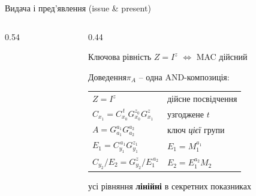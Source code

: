 \documentclass[aspectratio=169, 10pt, xcolor=svgnames]{beamer}
\begin{document}
\begin{frame}{Видача і пред'явлення (issue \& present)}
  \begin{columns}[T]
    \begin{column}{0.54\textwidth}
      \centering
      \resizebox{\linewidth}{!}{}
    \end{column}
    \begin{column}{0.44\textwidth}
      \begin{block}{Ключова рівність}
        \centering $Z = I^{z}$ \quad $\Longleftrightarrow$ \quad MAC дійсний
      \end{block}
      \small Доведення\footnotemark[1] $\pi_A$ -- одна AND-композиція:\par\smallskip
      \footnotesize
      \begin{tabular}{@{}ll@{}}
        $Z = I^{z}$                                   & дійсне посвідчення \\
        $C_{x_1} = C_{x_0}^{\,t}G_{x_0}^{z_0}G_{x_1}^{z}$ & узгоджене $t$ \\
        $A = G_{a_1}^{a_1}G_{a_2}^{a_2}$              & ключ \emph{цієї} групи \\
        $E_1 = C_{y_1}^{\,a_1}G_{y_1}^{z_1}$          & $E_1 = M_1^{a_1}$ \\
        $C_{y_2}/E_2 = G_{y_2}^{z}/E_1^{\,a_2}$        & $E_2 = E_1^{a_2}M_2$ \\
      \end{tabular}\par\smallskip
      \small усі рівняння \textbf{лінійні} в секретних показниках
    \end{column}
  \end{columns}
\end{frame}

\end{document}
